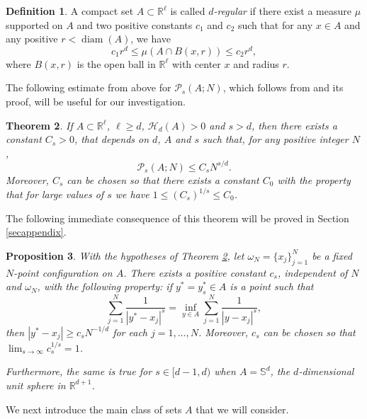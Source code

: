 \documentclass[12pt]{amsart}
\newtheorem{theorem}{Theorem}[section]
\newtheorem{prop}[theorem]{Proposition}
\theoremstyle{definition}
\newtheorem{defin}[theorem]{Definition}
\def\sli{\sum\limits}
\def\R{\mathbb{R}}
\newcommand{\1}{\mathbf{1}}
\newcommand{\diam}{\operatorname{diam}}
\newcommand{\PP}{\mathcal{P}}
\def\H{\mathcal{H}}
\begin{document}
\begin{defin}\label{defregular}
A compact set $A\subset \R^\ell$ is called {\it $d$-regular} if there exist a measure $\mu$ supported on $A$ and two positive constants $c_1$ and $c_2$ such that for any $x\in A$ and any positive $r<\diam(A)$, we have 
\begin{equation}
c_1r^d\leqslant \mu(A\cap B(x, r))\leqslant c_2r^d,
\end{equation}
where $B(x,r)$ is the open ball in $\R^\ell$ with center $x$ and radius $r$.
\end{defin}
The following estimate from above for $\PP_s(A; N)$, which follows from \cite[Theorem 2.4]{Erdelyi2013} and its proof, will be useful for our investigation.
\begin{theorem}\label{botest}
If $A\subset \R^\ell$, $\ell\geqslant d$, $\H_d(A)>0$ and $s>d$, then there exists a constant $C_s>0$, that depends on $d$, $A$ and $s$ such that, for any positive integer $N$,
\begin{equation}\label{aboveest}
\PP_s(A;N)\leqslant C_s N^{s/d}.
\end{equation}
Moreover, $C_s$ can be chosen so that there exists a constant $C_0$ with the property that for large values of $s$ we have $1\leqslant (C_s)^{1/s}\leqslant C_0$.
\end{theorem}
The following immediate consequence of this theorem will be proved in Section \ref{secappendix}.
\begin{prop}\label{babyhole}
With the hypotheses of Theorem \textup{\ref{botest}}, let $\omega_N=\{x_j\}_{j=1}^N$ be a fixed $N$-point configuration on $A$. There exists a positive constant $c_s$, independent of $N$ and $\omega_N$, with the following property: if $y^*=y^*_s\in A$ is a point such that
$$
\sli_{j=1}^N \frac{1}{|y^*-x_j|^s}=\inf_{y\in A}\sli_{j=1}^N \frac{1}{|y-x_j|^s},
$$
then $|y^*-x_j|\geqslant c_s N^{-1/d}$ for each $j=1,\ldots, N$. Moreover, $c_s$ can be chosen so that $\lim_{s\to \infty}c_s^{1/s}=1$.

Furthermore, the same is true for $s\in [d-1, d)$ when $A=\mathbb{S}^d$, the $d$-dimensional unit sphere in $\mathbb{R}^{d+1}$.
\end{prop}


We next introduce the main class of sets $A$ that we will consider. 
\end{document}
